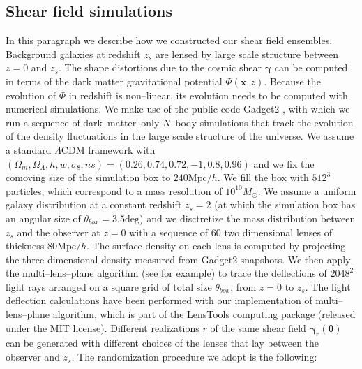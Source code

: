 \documentclass[reprint,aps,prd,superscriptaddress,showkeys,showpacs]{revtex4-1}
\newcommand{\bb}[1]{\mathbf{#1}}
\begin{document}
\subsection{Shear field simulations}
\label{shearsim}
%
In this paragraph we describe how we constructed our shear field ensembles. Background galaxies at redshift $z_s$ are lensed by large scale structure between $z=0$ and $z_s$. The shape distortions due to the cosmic shear $\pmb{\gamma}$ can be computed in terms of the dark matter gravitational potential $\Phi(\bb{x},z)$. Because the evolution of $\Phi$ in redshift is non--linear, its evolution needs to be computed with numerical simulations. We make use of the public code Gadget2 \citep{Gadget2}, with which we run a sequence of dark--matter--only $N$--body simulations that track the evolution of the density fluctuations in the large scale structure of the universe. We assume a standard $\Lambda$CDM framework with $(\Omega_m,\Omega_\Lambda,h,w,\sigma_8,ns)=(0.26,0.74,0.72,-1,0.8,0.96)$ and we fix the comoving size of the simulation box to $240\mathrm{Mpc}/h$. We fill the box with $512^3$ particles, which correspond to a mass resolution of $10^{10}M_\odot$. We assume a uniform galaxy distribution at a constant redshift $z_s=2$ (at which the simulation box has an angular size of $\theta_{box}=3.5\mathrm{deg}$) and we disctretize the mass distribution between $z_s$ and the observer at $z=0$ with a sequence of 60 two dimensional lenses of thickness $80\mathrm{Mpc}/h$. The surface density on each lens is computed by projecting the three dimensional density measured from Gadget2 snapshots. We then apply the multi--lens--plane algorithm (see \citep{RayTracingHartlap,RayTracingJain} for example) to trace the deflections of $2048^2$ light rays arranged on a square grid of total size $\theta_{box}$, from $z=0$ to $z_s$. The light deflection calculations have been performed with our implementation of multi--lens--plane algorithm, which is part of the LensTools computing package \citep{LensTools} (released under the MIT license). Different realizations $r$ of the same shear field $\pmb{\gamma}_r(\pmb{\theta})$ can be generated with different choices of the lenses that lay between the observer and $z_s$. The randomization procedure we adopt is the following:
\end{document}
